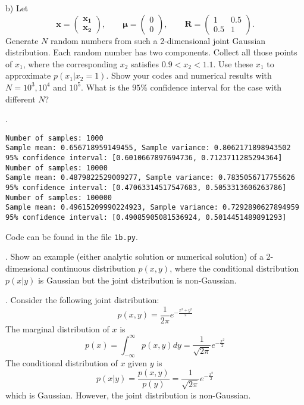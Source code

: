 \documentclass[a4paper,notitlepage,cs4size,cap,indent,oneside,12pt]{article}
\numberwithin{equation}{section}
\numberwithin{figure}{section}
\newcommand{\blue}{\color{blue}}
\begin{document}
b) Let
\begin{equation*}
    \mathbf{x} = \left(\begin{array}{cc} \mathbf{x}_{\mathbf{1}} \\ \mathbf{x}_{\mathbf{2}} \end{array}\right),\qquad\pmb{\mu} =\left(\begin{array}{cc} 0 \\ 0 \end{array}\right), \qquad \mathbf{R} = \left(\begin{array}{cc} 1 & 0.5 \\ 0.5 & 1 \end{array}\right).
\end{equation*}
Generate $N$ random numbers from such a 2-dimensional joint Gaussian distribution. Each random number has two components. Collect all those points of $x_1$, where the corresponding $x_2$ satisfies $0.9<x_2<1.1$. Use these $x_1$ to approximate $p(x_1|x_2 = 1)$. Show your codes and numerical results with $N= 10^3, 10^4$ and $10^5$. What is the $95\%$ confidence interval for the case with different $N$?\medskip

{\blue
{}.
\begin{verbatim}
Number of samples: 1000
Sample mean: 0.656718959149455, Sample variance: 0.8062171898943502
95% confidence interval: [0.6010667897694736, 0.7123711285294364]
Number of samples: 10000
Sample mean: 0.4879822529009277, Sample variance: 0.7835056717755626
95% confidence interval: [0.47063314517547683, 0.5053313606263786]
Number of samples: 100000
Sample mean: 0.49615209990224923, Sample variance: 0.7292890627894959
95% confidence interval: [0.49085905081536924, 0.5014451489891293]
\end{verbatim}

Code can be found in the file \texttt{1b.py}. 

}

. Show an example (either analytic solution or numerical solution) of a 2-dimensional continuous distribution $p(x,y)$, where the conditional distribution $p(x|y)$ is Gaussian but the joint distribution is non-Gaussian.\medskip

{\blue
{}.
Consider the following joint distribution:
\begin{equation*}
  p(x,y) = \frac{1}{2\pi}e^{-\frac{x^2 + y^2}{2}}
\end{equation*}
The marginal distribution of $x$ is
\begin{equation*}
  p(x) = \int_{-\infty}^{\infty} p(x,y) dy = \frac{1}{\sqrt{2\pi}}e^{-\frac{x^2}{2}}
\end{equation*}
The conditional distribution of $x$ given $y$ is
\begin{equation*}
  p(x|y) = \frac{p(x,y)}{p(y)} = \frac{1}{\sqrt{2\pi}}e^{-\frac{x^2}{2}}
\end{equation*}
which is Gaussian. However, the joint distribution is non-Gaussian. 
}
\end{document}
